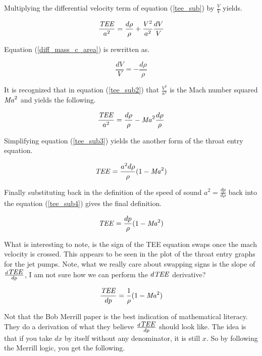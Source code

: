\documentclass{article}
\newcommand\Mach{\mbox{\textit{Ma}}}  %
\newcommand\Tee{\mbox{\textit{TEE}}}  %
\begin{document}
Multiplying the differential velocity term of equation (\ref{tee_sub}) by $\frac{V}{V}$ yields.

\begin{equation}
    \frac{\Tee}{a^2} = \frac{d\rho}{\rho} + \frac{V^2}{a^2}\frac{dV}{V}
    \label{tee_sub2}
\end{equation}

Equation (\ref{diff_mass_c_area}) is rewritten as.

\begin{equation}
    \frac{dV}{V} = - \frac{d\rho}{\rho}
\end{equation}

It is recognized that in equation (\ref{tee_sub2}) that $\frac{V^2}{a^2}$ is the Mach number squared $\Mach^2$ and yields the following.

\begin{equation}
\frac{\Tee}{a^2} = \frac{d\rho}{\rho} - \Mach^2\frac{d\rho}{\rho}
\label{tee_sub3} 
\end{equation}

Simplifying equation (\ref{tee_sub3}) yields the another form of the throat entry equation.

\begin{equation}
    \Tee = \frac{a^2d\rho}{\rho}(1 - \Mach^2)
\label{tee_sub4}    
\end{equation}

Finally substituting back in the definition of the speed of sound $a^2 = \frac{dp}{d\rho}$ back into the equation (\ref{tee_sub4}) gives the final definition.

\begin{equation}
    \Tee = \frac{dp}{\rho}(1 - \Mach^2)
\label{tee_final}    
\end{equation}

What is interesting to note, is the sign of the TEE equation swaps once the mach velocity is crossed. This appears to be seen in the plot of the throat entry graphs for the jet pumps. Note, what we really care about swapping signs is the slope of $\frac{d\Tee}{dp}$, I am not sure how we can perform the $d\Tee$ derivative?

\begin{equation}
\frac{\Tee}{dp} = \frac{1}{\rho}(1 - \Mach^2)
\end{equation}

Not that the Bob Merrill paper \cite{merrill} is the best indication of mathematical literacy. They do a derivation of what they believe $\frac{d\Tee}{dp}$ should look like. The idea is that if you take $dx$ by itself without any denominator, it is still $x$. So by following the Merrill logic, you get the following.
\end{document}
